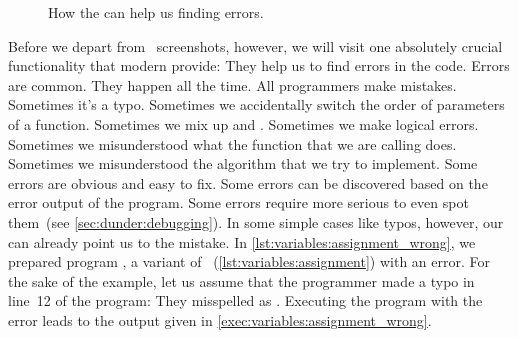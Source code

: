 %
\begin{figure}%
\ContinuedFloat%
\centering%
%
%
%
\floatRowSep%
%
%
%
\floatRowSep%
%
%
%
\caption{How the  can help us finding errors.}%
\label{fig:errorsInIdeC}%
\end{figure}%
%
Before we depart from \pycharm\ screenshots, however, we will visit one absolutely crucial functionality that modern  provide:
They help us to find errors in the code.
Errors are common.
They happen all the time.
All programmers make mistakes.
Sometimes it's a typo.
Sometimes we accidentally switch the order of parameters of a function.
Sometimes we mix up  and .
Sometimes we make logical errors.
Sometimes we misunderstood what the function that we are calling does.
Sometimes we misunderstood the algorithm that we try to implement.
Some errors are obvious and easy to fix.
Some errors can be discovered based on the error output of the program.
Some errors require more serious  to even spot them~(see \cref{sec:dunder:debugging}).
In some simple cases like typos, however, our  can already point us to the mistake.%
%
%
%
\label{sec:errorsFromExceptions}%
In \cref{lst:variables:assignment_wrong}, we prepared program , a variant of ~(\cref{lst:variables:assignment}) with an error.
For the sake of the example, let us assume that the programmer made a typo in line~12 of the program:
They misspelled  as .
Executing the program with the error leads to the output given in \cref{exec:variables:assignment_wrong}.


